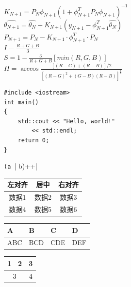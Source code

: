 \documentclass{ctexart}
\begin{document}
$ K_{N+1}=P_N\phi_{N+1}(1+\phi_{N+1}^{T}P_N\phi_{N+1})^{-1} $\\
$ \widehat{\theta_{N+1}}=\widehat{\theta_N}+K_{N+1}(y_{N+1}-\phi_{N+1}^T\widehat{\theta_N}) $\\
$ P_{N+1}=P_N-K_{N+1} \cdot \phi_{N+1}^T \cdot P_N $\\


$ I=\frac{R+G+B}{3} $\\
$ S=1-\frac{3}{R+G+B}[min(R,G,B)] $\\
$ H=\arccos\frac{[(R-G)+(R-B)]/2}{[(R-G)^2+(G-B)(R-B)]^\frac{1}{2}} $




\begin{verbatim}
#include <iostream>
int main()
{
    std::cout << "Hello, world!"
        << std::endl;
    return 0;
}
\end{verbatim}
\verb|(a || b)++|
\\
\centering
\begin{tabular}{|c|c|c|}
  \hline
  左对齐 & 居中 & 右对齐 \\
  \hline
  数据1 & 数据2 & 数据3 \\
  \cline{1-2}
  数据4 & 数据5 & 数据6 \\
  \hline
\end{tabular}
\par
\begin{tabularx}{14em}
  {|*{4}{>{\centering\arraybackslash}X|}}
  \hline
  A & B & C & D \\
  \hline
  ABC & BCD & CDE & DEF \\
  \hline
\end{tabularx}
\par
\begin{tabular}{|c|c|c|}
    \hline
    1 & 2 & 3 \\
    \hline
    \multicolumn{2}{|c|}{3} & 4\\
    \hline
    
\end{tabular}
\par
\end{document}
